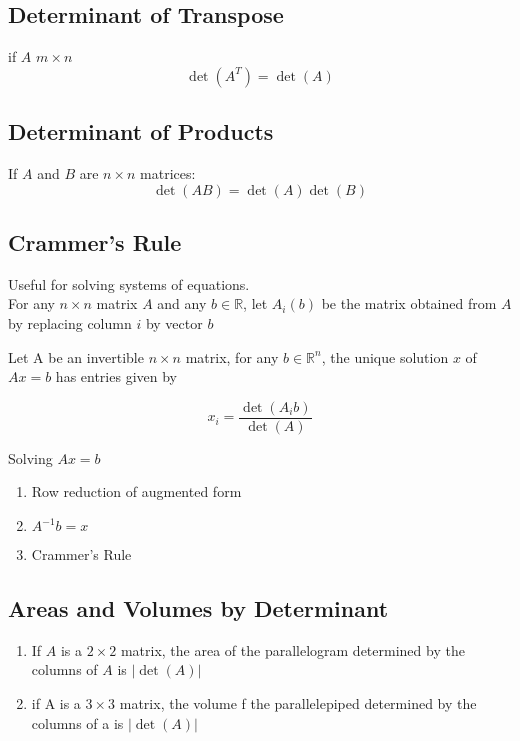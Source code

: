 \subsection{Determinant of Transpose}

if $A$ $m \times n$
\begin{equation}
	\label{Theorem5}
	\det(A^{T})=\det(A)
\end{equation} 

\subsection{Determinant of Products}

If $A$ and $B$ are $n\times n$ matrices:
\begin{equation}
	\label{Theorem6}
	\det(AB)=\det(A)\det(B)
\end{equation}

\subsection{Crammer's Rule}
Useful for solving systems of equations.\\
For any $n \times n$ matrix $A$ and any $b\in\mathbb{R}$, let $A_{i}(b)$ be the matrix obtained from $A$ by replacing column $i$ by vector $b$

\hfill
\hfill

Let A be an invertible $n \times n$ matrix, for any $b\in\mathbb{R}^{n}$, the unique solution $x$ of $Ax=b$ has entries given by 

\begin{equation}
	\label{Theorem7}
	x_{i}= \frac{\det(A_{i}b)}{\det(A)}
\end{equation}

Solving $Ax=b$
\begin{enumerate}
	\item 	Row reduction of augmented form
	\item 	$A^{-1}b=x$
	\item 	Crammer's Rule
\end{enumerate}

\subsection{Areas and Volumes by Determinant}

\begin{enumerate}
	\item 	If $A$ is a $2\times2$ matrix, the area of the parallelogram determined by the columns of $A$ is $|\det(A)|$

	\item if A is a $3 \times 3$ matrix, the volume f the parallelepiped determined by the columns of a is $|\det(A)|$
\end{enumerate}


